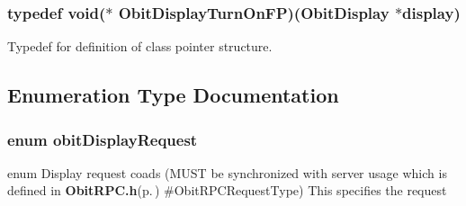 \subsubsection{\setlength{\rightskip}{0pt plus 5cm}typedef void($\ast$ {\bf Obit\-Display\-Turn\-On\-FP})({\bf Obit\-Display} $\ast$display)}\label{ObitDisplay_8h_a5}


Typedef for definition of class pointer structure. 



\subsection{Enumeration Type Documentation}
\subsubsection{\setlength{\rightskip}{0pt plus 5cm}enum {\bf obit\-Display\-Request}}\label{ObitDisplay_8h_a20}


enum Display request coads (MUST be synchronized with server usage which is defined in {\bf Obit\-RPC.h}{\rm (p.\,\pageref{ObitRPC_8h})} \#Obit\-RPCRequest\-Type) This specifies the request 

